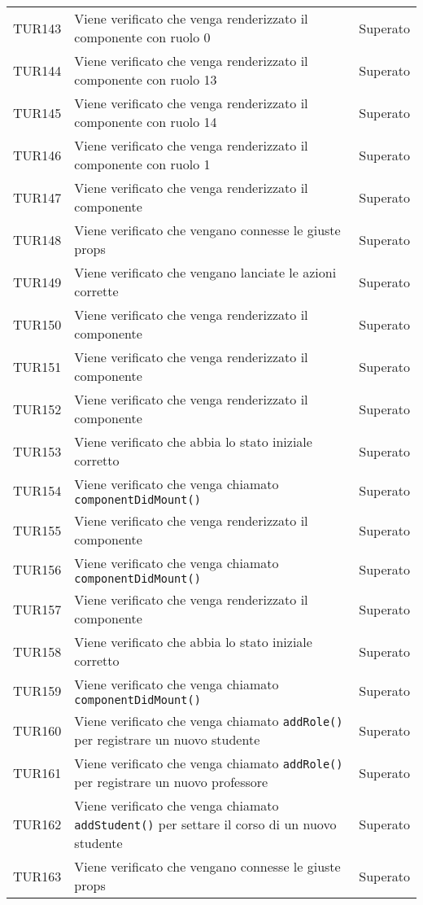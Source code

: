 \documentclass[PianoDiQualifica.tex]{subfiles}
\begin{document}
\begin{longtable}[H]{P{2cm}P{8.5cm}P{3cm}}
	TUR143 & Viene verificato che venga renderizzato il componente con ruolo 0 & Superato \\ 
	TUR144 & Viene verificato che venga renderizzato il componente con ruolo 13 & Superato \\ 
	TUR145 & Viene verificato che venga renderizzato il componente con ruolo 14 & Superato \\ 
	TUR146 & Viene verificato che venga renderizzato il componente con ruolo 1 & Superato \\ 
	TUR147 & Viene verificato che venga renderizzato il componente & Superato \\ 
	TUR148 & Viene verificato che vengano connesse le giuste props & Superato \\ 
	TUR149 & Viene verificato che vengano lanciate le azioni corrette & Superato \\ 
	TUR150 & Viene verificato che venga renderizzato il componente & Superato \\ 
	TUR151 & Viene verificato che venga renderizzato il componente & Superato \\ 
	TUR152 & Viene verificato che venga renderizzato il componente & Superato \\ 
	TUR153 & Viene verificato che abbia lo stato iniziale corretto & Superato \\ 
	TUR154 & Viene verificato che venga chiamato \texttt{componentDidMount()} & Superato \\ 
	TUR155 & Viene verificato che venga renderizzato il componente & Superato \\ 
	TUR156 & Viene verificato che venga chiamato \texttt{componentDidMount()} & Superato \\ 
	TUR157 & Viene verificato che venga renderizzato il componente & Superato \\ 
	TUR158 & Viene verificato che abbia lo stato iniziale corretto & Superato \\ 
	TUR159 & Viene verificato che venga chiamato \texttt{componentDidMount()} & Superato \\ 
	TUR160 & Viene verificato che venga chiamato \texttt{addRole()} per registrare un nuovo studente & Superato \\ 
	TUR161 & Viene verificato che venga chiamato \texttt{addRole()} per registrare un nuovo professore & Superato \\ 
	TUR162 & Viene verificato che venga chiamato \texttt{addStudent()} per settare il corso di un nuovo studente & Superato \\ 
	TUR163 & Viene verificato che vengano connesse le giuste props & Superato \\ 

\end{longtable}
\end{document}
